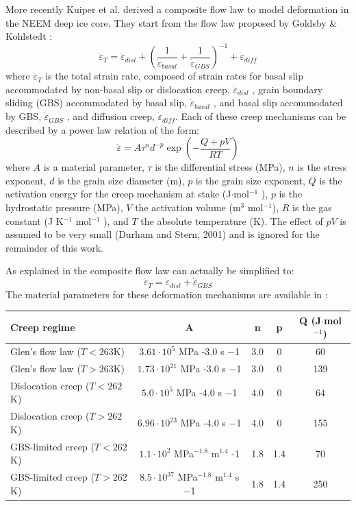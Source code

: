 More recently Kuiper et al. \cite{kuwd19,kudd19} derived a composite flow law 
to model deformation in the NEEM deep ice core. 
They start from the flow law proposed by Goldsby \& Kohlstedt \cite{goko01}:
\[
\dot{\varepsilon}_T = \dot{\varepsilon}_{disl} + 
\left(\frac{1}{ \dot{\varepsilon}_{basal}} + \frac{1}{ \dot{\varepsilon}_{GBS}} \right)^{-1} 
+  \dot{\varepsilon}_{diff}
\]
where $\dot{\varepsilon}_T$  is the total strain rate, 
composed of strain rates for basal slip accommodated by non-basal slip or dislocation creep,
$\dot{\varepsilon}_{disl}$ , grain boundary sliding (GBS) accommodated by basal slip, 
$\dot{\varepsilon}_{basal}$ , and basal slip accommodated by GBS, 
$\dot{\varepsilon}_{GBS}$ , and diffusion creep, 
$\dot{\varepsilon}_{diff}$. Each of these creep mechanisms can be described by a 
power law relation of the form:
\[
\dot{\varepsilon} = A \tau^n d^{-p} \exp \left( -\frac{Q+pV}{RT} \right)
\]
where $A$ is a material parameter, $\tau$ is the differential stress (MPa), 
$n$ is the stress exponent, $d$ is the grain size diameter (m), 
$p$ is the grain size exponent, $Q$ is the activation energy for the creep 
mechanism at stake (J$\cdot$mol$^{-1}$ ), $p$ is the hydrostatic pressure (MPa), 
$V$ the activation volume (m$^3$ mol$^{-1}$), 
$R$ is the gas constant (J K$^{−1}$ mol$^{-1}$ ), and $T$ the absolute temperature (K). 
The effect of $pV$ is assumed to be very small (Durham and Stern, 2001) \cite{dust01} 
and is ignored for the remainder of this work.

As explained in \cite{kuwd19} the composite flow law can actually be simplified to:
\[
\dot{\varepsilon}_T = \dot{\varepsilon}_{disl} + \dot{\varepsilon}_{GBS}
\]
The material parameters for these deformation mechanisms are available in \cite{kudd19}:
\begin{center}
\begin{tabular}{lcccc}
\hline
Creep regime & A & n & p & Q (J$\cdot$mol$^{-1}$) \\
\hline\hline
Glen's flow law ($T<263$K) &$3.61\cdot10^5$ MPa -3.0 s −1 &3.0 &0 &60\\
Glen's flow law ($T>263$K) &$1.73\cdot10^{21}$ MPa -3.0 s −1 &3.0 &0 &139\\
\hline
Dislocation creep ($T<262$K) & $5.0\cdot10^5$ MPa -4.0 s −1 &4.0 &0 &64\\
Dislocation creep ($T>262$K) &$6.96\cdot 10^{23}$ MPa -4.0 s −1 &4.0 &0 &155\\
\hline
GBS-limited creep ($T<262$K) & $1.1\cdot 10^2$ MPa$^{-1.8}$ m$^{1.4}$ -1 &1.8 &1.4 &70\\
GBS-limited creep ($T>262$K) & $8.5\cdot10^37$ MPa$^{-1.8}$ m$^{1.4}$ s −1 &1.8 &1.4 &250\\
\hline
\end{tabular}
\end{center}



